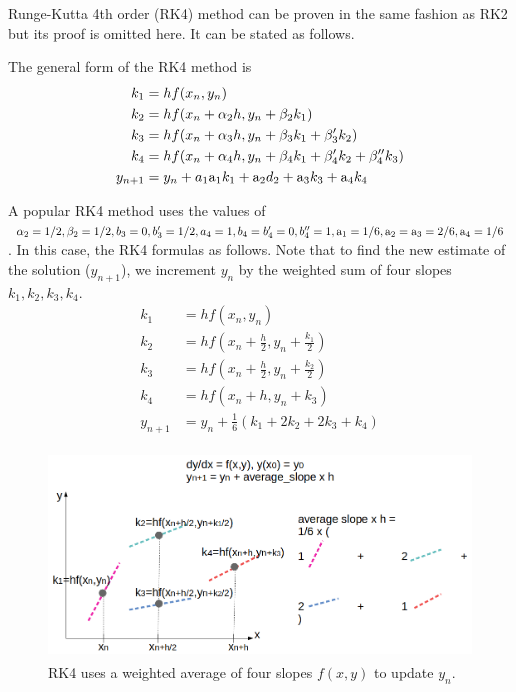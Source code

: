 \documentclass[a4paper]{article}
\begin{document}
Runge-Kutta 4th order (RK4) method can be proven in the same fashion as RK2 but its proof is omitted here. It can be stated as follows.
\begin{definition}[Runge-Kutta 4]
The general form of the RK4 method is
\begin{align}
    k_1 &= hf(x_n,y_n) \\
    k_2 &= hf(x_n + \alpha_2h, y_n + \beta_2 k_1) \\
    k_3 &= hf(x_n + \alpha_3h, y_n + \beta_3 k_1 + \beta_3' k_2) \\
    k_4 &= hf(x_n + \alpha_4h, y_n + \beta_4 k_1 + \beta_4' k_2 + \beta_4'' k_3) \\
    y_{n+1} &= y_n + a_1\textup{a}_1 k_1 + \textup{a}_2 d_2 + \textup{a}_3 k_3 + \textup{a}_4 k_4
\end{align}
\end{definition}
A popular RK4 method uses the values of $\alpha_2=1/2, \beta_2 = 1/2, b_3 = 0, b_3' = 1/2, a_4 = 1, b_4 = b_4' = 0, b_4''=1, \textup{a}_1 = 1/6, \textup{a}_2 = \textup{a}_3 = 2/6, \textup{a}_4 = 1/6$. In this case, the RK4 formulas as follows. Note that to find the new estimate of the solution ($y_{n+1}$), we increment $y_n$ by the weighted sum of four slopes $k_1,k_2,k_3,k_4$.
\begin{align}
    k_1 &= hf(x_n,y_n) \label{eq:rk4_1_1} \\
    k_2 &= hf(x_n + \frac{h}{2}, y_n + \frac{k_1}{2}) \\
    k_3 &= hf(x_n + \frac{h}{2}, y_n + \frac{k_2}{2}) \\
    k_4 &= hf(x_n +h, y_n + k_3) \\
    y_{n+1} &= y_n + \frac{1}{6}\left(k_1 + 2k_2 + 2k_3 + k_4 \right) \label{eq:rk4_1_4}
\end{align}

\begin{figure}[H]
    \centering
    \includegraphics[height=5.5cm]{img/rk/diagram_rk4_slopes.png}
    \caption{RK4 uses a weighted average of four slopes $f(x,y)$ to update $y_n$.}
\end{figure}
\end{document}
